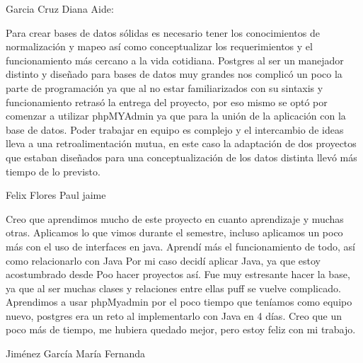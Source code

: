 \documentclass[30pt,fleqn]{article}
\begin{document}
\vspace{10mm} %

Garcia Cruz Diana Aide:

Para crear bases de datos sólidas es necesario tener los conocimientos de normalización y mapeo así como conceptualizar los requerimientos y el funcionamiento más cercano a la vida cotidiana. Postgres al ser un manejador distinto y diseñado para bases de datos muy grandes nos complicó un poco la parte de programación ya que al no estar familiarizados con su sintaxis y funcionamiento retrasó la entrega del proyecto, por eso mismo se optó por comenzar a utilizar phpMYAdmin ya que para la unión de la aplicación con la base de datos. Poder trabajar en equipo es complejo y el intercambio de ideas lleva a una retroalimentación mutua, en este caso la adaptación de dos proyectos que estaban diseñados para una conceptualización de los datos distinta llevó más tiempo de lo previsto. 

\vspace{10mm} %

Felix Flores Paul jaime

Creo que aprendimos mucho de este proyecto en cuanto aprendizaje y muchas otras. Aplicamos lo que vimos durante el semestre, incluso aplicamos un poco más con el uso de interfaces en java.
Aprendí más el funcionamiento de todo, así como relacionarlo con Java
Por mi caso decidí aplicar Java, ya que estoy acostumbrado desde Poo hacer proyectos así. Fue muy estresante hacer la base, ya que al ser muchas clases y relaciones entre ellas puff se vuelve complicado. Aprendimos a usar phpMyadmin por el poco tiempo que teníamos como equipo nuevo, postgres era un reto al implementarlo con Java en 4 días. Creo que un poco más de tiempo, me hubiera quedado mejor, pero estoy feliz con mi trabajo.

\vspace{10mm} %

Jiménez García María Fernanda
\end{document}
